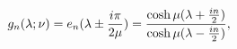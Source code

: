 \begin{equation}
g_{n}(\lambda;\nu) = e_{n}(\lambda \pm {i \pi\over 2 \mu})={\cosh
\mu(\lambda +{in\over 2}) \over \cosh \mu(\lambda -{in\over 2})}\\,
\label{gg}
\end{equation}

